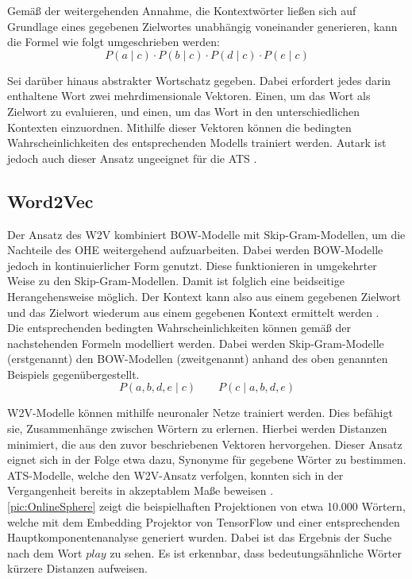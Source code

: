 \noindent
Gemäß der weitergehenden Annahme, die Kontextwörter ließen sich auf Grundlage eines gegebenen Zielwortes unabhängig voneinander generieren, kann die Formel wie folgt umgeschrieben werden: $$P(a \mid c) \cdot P(b \mid c) \cdot P(d \mid c) \cdot P(e \mid c)$$
\newpage

\noindent
Sei darüber hinaus abstrakter Wortschatz gegeben. Dabei erfordert jedes darin enthaltene Wort zwei mehrdimensionale Vektoren. Einen, um das Wort als Zielwort zu evaluieren, und einen, um das Wort in den unterschiedlichen Kontexten einzuordnen. Mithilfe dieser Vektoren können die bedingten Wahrscheinlichkeiten des entsprechenden Modells trainiert werden. Autark ist jedoch auch dieser Ansatz ungeeignet für die \ac{ATS} \cite[S.~641]{ZHA20}.


\subsection{Word2Vec}
\noindent
Der Ansatz des \ac{W2V} kombiniert \ac{BOW}-Modelle mit Skip-Gram-Modellen, um die Nachteile des \ac{OHE} weitergehend aufzuarbeiten. Dabei werden \ac{BOW}-Modelle jedoch in kontinuierlicher Form genutzt. Diese funktionieren in umgekehrter Weise zu den Skip-Gram-Modellen. Damit ist folglich eine beidseitige Herangehensweise möglich. Der Kontext kann also aus einem gegebenen Zielwort und das Zielwort wiederum aus einem gegebenen Kontext ermittelt werden \cite[S.~644]{ZHA20}.\\

\noindent
Die entsprechenden bedingten Wahrscheinlichkeiten können gemäß der nachstehenden Formeln modelliert werden. Dabei werden Skip-Gram-Modelle (erstgenannt) den \ac{BOW}-Modellen (zweitgenannt) anhand des oben genannten Beispiels gegenübergestellt. $$P(a, b, d, e \mid c) \qquad P(c \mid a, b, d, e)$$

\noindent
\ac{W2V}-Modelle können mithilfe neuronaler Netze trainiert werden. Dies befähigt sie, Zusammenhänge zwischen Wörtern zu erlernen. Hierbei werden Distanzen minimiert, die aus den zuvor beschriebenen Vektoren hervorgehen. Dieser Ansatz eignet sich in der Folge etwa dazu, Synonyme für gegebene Wörter zu bestimmen. \ac{ATS}-Modelle, welche den \ac{W2V}-Ansatz verfolgen, konnten sich in der Vergangenheit bereits in akzeptablem Maße beweisen \cite{KAR18}.\\

\noindent
\autoref{pic:OnlineSphere} zeigt die beispielhaften Projektionen von etwa 10.000 Wörtern, welche mit dem Embedding Projektor von TensorFlow und einer entsprechenden Hauptkomponentenanalyse generiert wurden. Dabei ist das Ergebnis der Suche nach dem Wort $play$ zu sehen. Es ist erkennbar, dass bedeutungsähnliche Wörter kürzere Distanzen aufweisen.
\newpage

